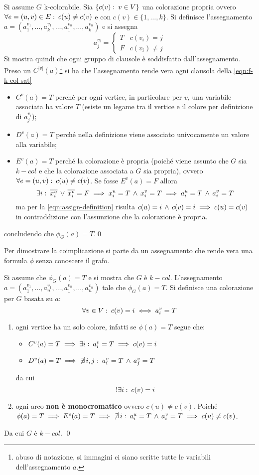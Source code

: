 \begin{demonstration}[$\implies$]
	Si assume $G$ k-colorabile. Sia $\{c(v)\,\colon\, v\in V\}$ una colorazione propria ovvero $\forall e=(u,v)\in E\,\colon\, c(u)\ne c(v)$ e con $c(v)\in\{1,\dots,k\}$. Si definisce l'assegnamento $a=(a^{v_1}_1,\dots, a^{v_1}_k,\dots, a^{v_n}_1,\dots,a^{v_n}_k)$ e si assegna 
	\begin{equation}
		a^{v_i}_j=\begin{cases}
			T & c(v_i)=j\\
			F & c(v_i)\ne j
		\end{cases}\label{eqn:assign-definition}
	\end{equation}
	Si mostra quindi che ogni gruppo di clausole è soddisfatto dall'assegnamento. Preso un $C^{|v|}(a)$\footnote{abuso di notazione, si immagini ci siano scritte tutte le variabili dell'assegnamento $a$.} si ha che l'assegnamento rende vera ogni clausola della \cref{eqn:f-k-col-sat}
	\begin{itemize}
		\item $C^v(a)=T$ perché per ogni vertice, in particolare per $v$, una variabile associata ha valore $T$ (esiste un legame tra il vertice e il colore per definizione di $a^{v_i}_j$);
		\item $D^v(a)=T$ perché nella definizione viene associato univocamente un valore alla variabile;
		\item $E^v(a)=T$ perché la colorazione è propria (poiché viene assunto che $G$ sia $k-col$ e che la colorazione associata a $G$ sia propria), ovvero $\forall e=(u,v)\,\colon\, c(u)\ne c(v)$. Se fosse $E^v(a)=F$ allora \[\exists i\,\colon\, \overline{x_i^u}\,\vee\, \overline{x_i^v}=F\implies x_i^u=T\,\wedge\, x_i^v=T\implies a_i^u=T\,\wedge\, a_i^v=T\]
		ma per la \cref{eqn:assign-definition} risulta $c(u)=i \,\wedge\, c(v)=i \implies c(u)=c(v)$ in contraddizione con l'assunzione che la colorazione è propria.
	\end{itemize}
	concludendo che $\phi_G(a)=T$.\qed
\end{demonstration}
Per dimostrare la coimplicazione si parte da un assegnamento che rende vera una formula $\phi$ senza conoscere il grafo.
\begin{demonstration}[$\impliedby$]
	Si assume che $\phi_G(a)=T$ e si mostra che $G$ è $k-col$. L'assegnamento $a=(a_1^{v_1},\dots,a_n^{v_1},\dots,a_1^{v_n},\dots,a_n^{v_n})$ tale che $\phi_G(a)=T$. Si definisce una colorazione per $G$ basata su $a$:
	\[\forall v\in V\,\colon\, c(v)=i\iff a_i^v=T\]
	\begin{enumerate}
		\item ogni vertice ha un solo colore, infatti se $\phi(a)=T$ segue che:
		\begin{itemize}
			\item $C^v(a)=T\implies\exists i \,\colon\, a_i^v=T \implies c(v)=i$
			\item $D^v(a)=T\implies \,\cancel{\exists}\, i,j\,\colon\, a_i^v=T\,\wedge\, a_j^v=T$
		\end{itemize}
		da cui \[!\exists i\,\colon\, c(v)=i\]
		\item ogni arco \textbf{non è monocromatico} ovvero $c(u)\ne c(v)$. Poiché $\phi(a)=T\implies E^e(a)=T\implies\,\cancel{\exists}\,  i\,\colon\, a_i^u=T \,\wedge\, a_i^v=T\implies c(u)\ne c(v)$.
	\end{enumerate}
	Da cui $G$ è $k-col$. \qed
\end{demonstration}
